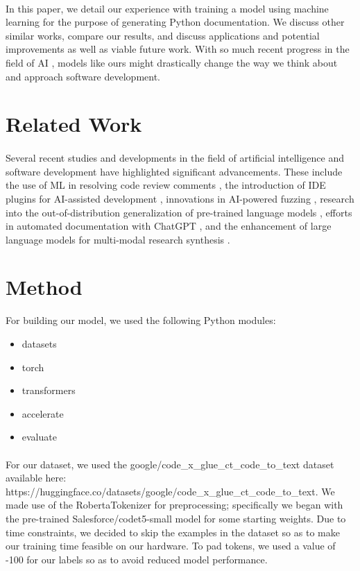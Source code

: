 \documentclass[12pt]{article}
\begin{document}
	\paragraph{} In this paper, we detail our experience with training a model using machine learning for the purpose of generating Python documentation. We discuss other similar works, compare our results, and discuss applications and potential improvements as well as viable future work. With so much recent progress in the field of AI \cite{shietal2020IoT_AI}, models like ours might drastically change the way we think about and approach software development.

	\section{Related Work}
	\paragraph{} Several recent studies and developments in the field of artificial intelligence and software development have highlighted significant advancements. These include the use of ML in resolving code review comments \cite{google2023codeReviewML}, the introduction of IDE plugins for AI-assisted development \cite{qodoAI2024idePlugin}, innovations in AI-powered fuzzing \cite{google2023aiFuzzing, cso2024aiFuzzing}, research into the out-of-distribution generalization of pre-trained language models \cite{chen2023oodGeneralization}, efforts in automated documentation with ChatGPT \cite{awekrx2024autodoc}, and the enhancement of large language models for multi-modal research synthesis \cite{wiggers2023largeModels}.


	\section{Method}
	For building our model, we used the following Python modules:
	\begin{itemize}
		\item datasets
		\item torch
		\item transformers
		\item accelerate
		\item evaluate
	\end{itemize}
	\paragraph{} For our dataset, we used the google/code\_x\_glue\_ct\_code\_to\_text dataset available here: https://huggingface.co/datasets/google/code\_x\_glue\_ct\_code\_to\_text. We made use of the RobertaTokenizer for preprocessing; specifically we began with the pre-trained Salesforce/codet5-small model for some starting weights. Due to time constraints, we decided to skip the examples in the dataset so as to make our training time feasible on our hardware. To pad tokens, we used a value of -100 for our labels so as to avoid reduced model performance. 
\end{document}
